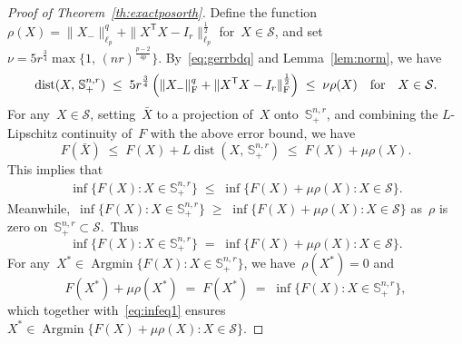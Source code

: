 \documentclass[11pt,a4paper]{article}  %
\theoremstyle{definition}
\DeclareMathOperator*{\Argmin}{Argmin}
\DeclareMathOperator{\dist}{dist}
\newcommand{\sset}{\mathcal{S}}
\newcommand{\res}{\rho}
\newcommand{\pen}{\res}
\newcommand{\penpar}{\mu}
\newcommand{\col}{r}
\newcommand{\stf}[1]{\mathbb{S}^{#1}}
\newcommand{\fro}{{\scriptstyle{\textnormal{F}}}}
\newcommand{\trs}{{\scriptstyle{\mathsf{T}}}}
\begin{document}
\begin{proof}[Proof of Theorem~\ref{th:exactposorth}]
    {Define the function~$\pen(X) = \|X_{-}\|_{\ell_p}^{q} + \|X^\trs X -I_\col\|_{\ell_p}^{\frac{1}{2}}$
    for~$X\in\sset$,}
    and set $\nu=5\col^{\frac{3}{4}}\max\Big\{1, \, (n\col)^{\frac{p-2}{4p}}\Big\}$.
        By~\eqref{eq:gerrbdq} and Lemma~\ref{lem:norm}, we have
    \begin{equation*}
        \dist(X,\, \stf{n, \col}_+)
        \;\le\;
        5\col^{\frac{3}{4}} \left(\|X_{-}\|_\fro^{q} + \|X^\trs X -I_\col\|_\fro^{\frac{1}{2}}\right)
        \;\le\; \nu \pen(X)
        \quad  \text{for} \quad X \in \sset.
    \end{equation*}
    For any~$X \in \sset$, setting~$\bar{X}$ to a projection of~$X$ onto~$\stf{n, \col}_+$,
    and combining the \mbox{$L$-Lipschitz} continuity of~$F$ with the above error bound, we have
    \begin{equation}
        \nonumber
        F(\bar{X}) \;\le\;
        F(X) + L\dist(X,\,\stf{n, \col}_+) \;\le\;
        F(X) + \penpar   \pen(X).
    \end{equation}
    This implies that
    \begin{equation}
        \nonumber
        \begin{split}
        \inf\{F(X) \mathrel{:} X \in \stf{n, \col}_+\}
        \;\le\; \inf\{F(X) + \penpar  \pen(X)\mathrel{:}  X\in\sset\}.
        \end{split}
    \end{equation}
    Meanwhile,~$\inf\{F(X) \mathrel{:} X \in \stf{n, \col}_+\}
        \;\ge\; \inf\{F(X) +\penpar  \pen(X)\mathrel{:}  X\in\sset\}$ as~$\pen$ is zero on~$\stf{n, \col}_+\subset\sset$.~Thus%
    \begin{equation}
        \label{eq:infeq1}
        \inf\{F(X) \mathrel{:} X \in \stf{n, \col}_+\}
        \;=\; \inf\{F(X) + \penpar  \pen(X)\mathrel{:}  X\in\sset\}.
    \end{equation}
    For any~$X^*\in   \Argmin\{F(X) \mathrel{:} X \in \stf{n, \col}_+\}$, we have~$\pen(X^*) = 0$ and
    \begin{equation}
        \nonumber
        F(X^*) + \penpar  \pen(X^*) \;=\; F(X^*) \;=\; \inf \{F(X) \mathrel{:} X \in \stf{n, \col}_+\},
    \end{equation}
    which together with~\eqref{eq:infeq1}
    ensures~$X^*\in  \Argmin\{F(X) + \penpar  \pen(X)\mathrel{:} X \in \sset\}$.


\end{proof}
\end{document}
